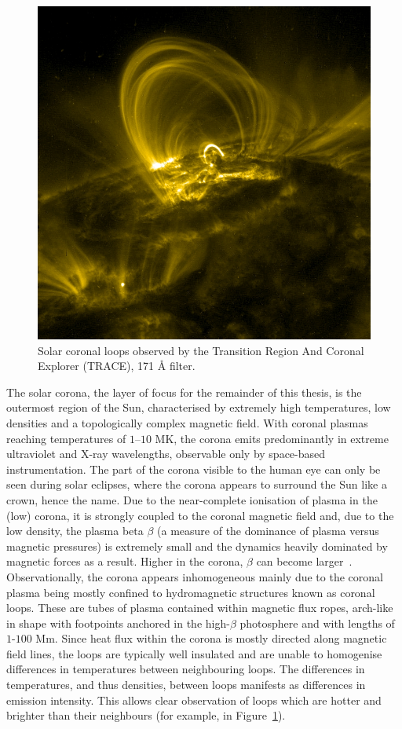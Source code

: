 \begin{figure}[t]
  \centering
  \includegraphics[width=0.5\linewidth]{Traceimage.jpg}
  \caption{Solar coronal loops observed by the Transition Region And Coronal Explorer (TRACE), 171 Å filter.}%
  \label{fig:coronal_loops}
\end{figure}

The solar corona, the layer of focus for the remainder of this thesis, is the outermost region of the Sun, characterised by extremely high temperatures, low densities and a topologically complex magnetic field. With coronal plasmas reaching temperatures of $1$--$10$ MK, the corona emits predominantly in extreme ultraviolet and X-ray wavelengths, observable only by space-based instrumentation. The part of the corona visible to the human eye can only be seen during solar eclipses, where the corona appears to surround the Sun like a crown, hence the name. Due to the near-complete ionisation of plasma in the (low) corona, it is strongly coupled to the coronal magnetic field and, due to the low density, the plasma beta $\beta$ (a measure of the dominance of plasma versus magnetic pressures) is extremely small and the dynamics heavily dominated by magnetic forces as a result. Higher in the corona, $\beta$ can become larger~\cite{gomezPlasmaUpbetaEvolution2019}. Observationally, the corona appears inhomogeneous mainly due to the coronal plasma being mostly confined to hydromagnetic structures known as coronal loops. These are tubes of plasma contained within magnetic flux ropes, arch-like in shape with footpoints anchored in the high-$\beta$ photosphere and with lengths of $1$-$100$ Mm. Since heat flux within the corona is mostly directed along magnetic field lines, the loops are typically well insulated and are unable to homogenise differences in temperatures between neighbouring loops. The differences in temperatures, and thus densities, between loops manifests as differences in emission intensity. This allows clear observation of loops which are hotter and brighter than their neighbours (for example, in Figure~\ref{fig:coronal_loops}).

